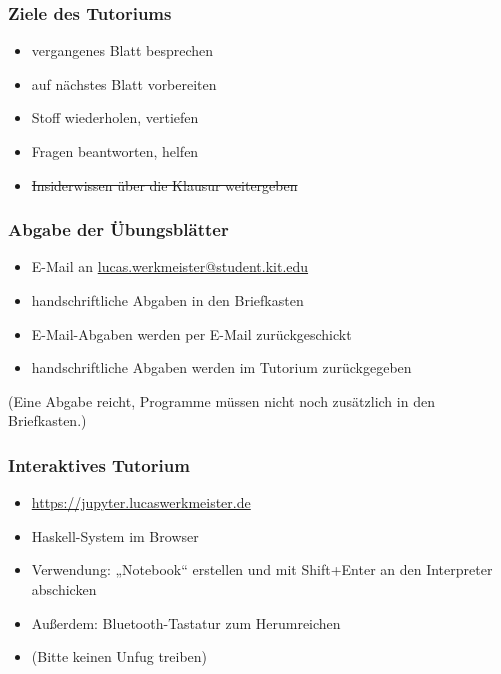 \documentclass{beamer}
\date{2016-10-24/25}
\begin{document}
\normalsize
\normalem

\begin{frame}[plain]
  \titlepage
\end{frame}

\begin{frame}
  \frametitle{Ziele des Tutoriums}
  \pause
  \begin{itemize}
  \item vergangenes Blatt besprechen
  \item auf nächstes Blatt vorbereiten
  \item Stoff wiederholen, vertiefen
  \item Fragen beantworten, helfen
  \item \sout{Insiderwissen über die Klausur weitergeben}
  \end{itemize}
\end{frame}

\begin{frame}
  \frametitle{Abgabe der Übungsblätter}
  \begin{itemize}
  \item E-Mail an \href{mailto:lucas.werkmeister@student.kit.edu?subject=[PP2016] Blatt X, MN 1234567}{lucas.werkmeister@student.kit.edu}
  \item handschriftliche Abgaben in den Briefkasten
  \item E-Mail-Abgaben werden per E-Mail zurückgeschickt
  \item handschriftliche Abgaben werden im Tutorium zurückgegeben
  \end{itemize}
  (Eine Abgabe reicht, Programme müssen nicht noch zusätzlich in den Briefkasten.)
\end{frame}

\begin{frame}
  \frametitle{Interaktives Tutorium}
  \begin{itemize}
  \item \url{https://jupyter.lucaswerkmeister.de}
  \item Haskell-System im Browser
  \item Verwendung: „Notebook“ erstellen und mit Shift+Enter an den Interpreter abschicken
  \item Außerdem: Bluetooth-Tastatur zum Herumreichen
  \item (Bitte keinen Unfug treiben)
  \end{itemize}
\end{frame}
\end{document}
